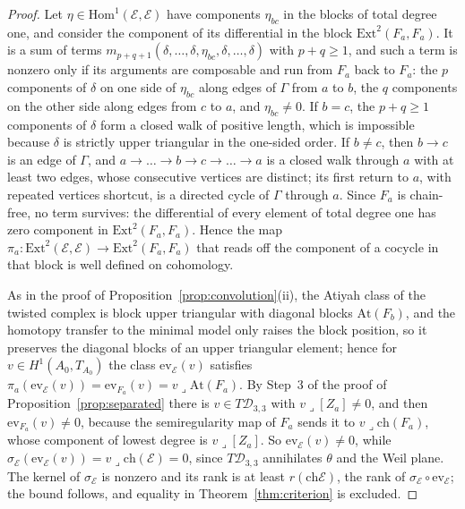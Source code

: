 \documentclass[11pt,reqno]{amsart}
\numberwithin{equation}{section}
\theoremstyle{plain}
\theoremstyle{definition}
\newcommand{\Ext}{\mathrm{Ext}}
\newcommand{\Hom}{\mathrm{Hom}}
\newcommand{\ch}{\mathrm{ch}}
\newcommand{\cD}{\mathcal{D}}
\begin{document}
\begin{proof}
Let $\eta\in\Hom^{1}(\mathcal{E},\mathcal{E})$ have components $\eta_{bc}$ in the blocks of total degree one, and consider the component of its differential in the block $\Ext^{2}(F_{a},F_{a})$. It is a sum of terms $m_{p+q+1}(\delta,\dots,\delta,\eta_{bc},\delta,\dots,\delta)$ with $p+q\ge1$, and such a term is nonzero only if its arguments are composable and run from $F_{a}$ back to $F_{a}$: the $p$ components of $\delta$ on one side of $\eta_{bc}$ along edges of $\Gamma$ from $a$ to $b$, the $q$ components on the other side along edges from $c$ to $a$, and $\eta_{bc}\ne0$. If $b=c$, the $p+q\ge1$ components of $\delta$ form a closed walk of positive length, which is impossible because $\delta$ is strictly upper triangular in the one-sided order. If $b\ne c$, then $b\to c$ is an edge of $\Gamma$, and $a\to\dots\to b\to c\to\dots\to a$ is a closed walk through $a$ with at least two edges, whose consecutive vertices are distinct; its first return to $a$, with repeated vertices shortcut, is a directed cycle of $\Gamma$ through $a$. Since $F_{a}$ is chain-free, no term survives: the differential of every element of total degree one has zero component in $\Ext^{2}(F_{a},F_{a})$. Hence the map $\pi_{a}\colon\Ext^{2}(\mathcal{E},\mathcal{E})\to\Ext^{2}(F_{a},F_{a})$ that reads off the component of a cocycle in that block is well defined on cohomology.

As in the proof of Proposition~\ref{prop:convolution}(ii), the Atiyah class of the twisted complex is block upper triangular with diagonal blocks $\mathrm{At}(F_{b})$, and the homotopy transfer to the minimal model only raises the block position, so it preserves the diagonal blocks of an upper triangular element; hence for $v\in H^{1}(A_{0},T_{A_{0}})$ the class $\mathrm{ev}_{\mathcal{E}}(v)$ satisfies $\pi_{a}(\mathrm{ev}_{\mathcal{E}}(v))=\mathrm{ev}_{F_{a}}(v)=v\lrcorner\mathrm{At}(F_{a})$. By Step~3 of the proof of Proposition~\ref{prop:separated} there is $v\in T\cD_{3,3}$ with $v\lrcorner[Z_{a}]\ne0$, and then $\mathrm{ev}_{F_{a}}(v)\ne0$, because the semiregularity map of $F_{a}$ sends it to $v\lrcorner\ch(F_{a})$, whose component of lowest degree is $v\lrcorner[Z_{a}]$. So $\mathrm{ev}_{\mathcal{E}}(v)\ne0$, while $\sigma_{\mathcal{E}}(\mathrm{ev}_{\mathcal{E}}(v))=v\lrcorner\ch(\mathcal{E})=0$, since $T\cD_{3,3}$ annihilates $\theta$ and the Weil plane. The kernel of $\sigma_{\mathcal{E}}$ is nonzero and its rank is at least $r(\ch\mathcal{E})$, the rank of $\sigma_{\mathcal{E}}\circ\mathrm{ev}_{\mathcal{E}}$; the bound follows, and equality in Theorem~\ref{thm:criterion} is excluded.
\end{proof}
\end{document}
